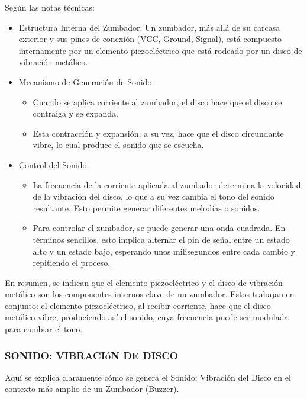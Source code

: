 \documentclass{report}
\begin{document}
Según las notas técnicas:
\begin{itemize}
    \item Estructura Interna del Zumbador: Un zumbador, más allá de su carcasa exterior y sus pines de conexión (VCC, Ground, Signal), está compuesto 
    internamente por un elemento piezoeléctrico que está rodeado por un disco de vibración metálico.
    \item Mecanismo de Generación de Sonido:
    \begin{itemize}
        \item Cuando se aplica corriente al zumbador, el disco hace que el disco se contraiga y se expanda.
        \item Esta contracción y expansión, a su vez, hace que el disco circundante vibre, lo cual produce el sonido que se escucha.
    \end{itemize}
    \item Control del Sonido:
    \begin{itemize}
        \item La frecuencia de la corriente aplicada al zumbador determina la velocidad de la vibración del disco, lo que a su vez 
        cambia el tono del sonido resultante. Esto permite generar diferentes melodías o sonidos.
        \item Para controlar el zumbador, se puede generar una onda cuadrada. En términos sencillos, esto implica alternar el pin de señal entre 
        un estado alto y un estado bajo, esperando unos milisegundos entre cada cambio y repitiendo el proceso.
    \end{itemize}
\end{itemize}
En resumen, se  indican que el elemento piezoeléctrico y el disco de vibración metálico son los componentes internos clave de un zumbador. 
Estos trabajan en conjunto: el elemento piezoeléctrico, al recibir corriente, hace que el disco metálico vibre, produciendo así el sonido, cuya 
frecuencia puede ser modulada para cambiar el tono.

\subsubsection{SONIDO: VIBRACIóN DE DISCO}
Aquí se explica claramente cómo se genera el Sonido: Vibración del Disco en el contexto más amplio de un Zumbador (Buzzer).
\end{document}
